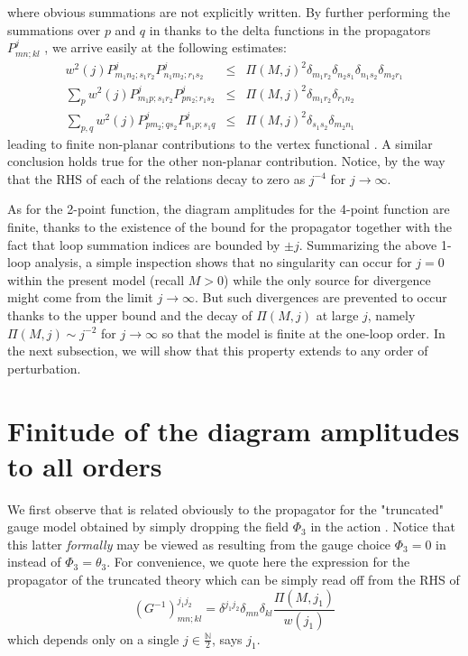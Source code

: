 \documentclass[10pt]{book}
\theoremstyle{break}
\begin{document}
where obvious summations are not explicitly written. By further performing the summations over $p$ and $q$ in %
thanks to the delta functions in the propagators $P^j_{mn;kl}$ %
, we arrive easily at the following estimates:
\begin{eqnarray}
w^2(j)P^j_{m_1n_2;s_1r_2}P^j_{n_1m_2;r_1s_2}&\le&\Pi(M,j)^2\delta_{m_1r_2}\delta_{n_2s_1}\delta_{n_1s_2}\delta_{m_2r_1}%
\\
\sum_pw^2(j)P^j_{m_1p;s_1r_2}P^j_{pn_2;r_1s_2}&\le&\Pi(M,j)^2\delta_{m_1r_2}\delta_{r_1n_2}%
\\
\sum_{p,q}w^2(j)P^j_{pm_2;qs_2}P^j_{n_1p;s_1q}&\le&\Pi(M,j)^2\delta_{s_1s_2}\delta_{m_2n_1}%
\end{eqnarray}
leading to finite non-planar contributions to the vertex functional %
. A similar conclusion holds true for the other non-planar contribution. Notice, by the way that the RHS of each of the relations %
decay to zero as $j^{-4}$ for $j\to\infty$.\par

As for the 2-point function, the diagram amplitudes for the 4-point function are finite, thanks to the existence of the bound for the propagator %
together with the fact that loop summation indices are bounded by $\pm j$. Summarizing the above 1-loop analysis, a simple inspection shows that no singularity can occur for $j=0$ within the present model (recall $M>0$) while the only source for divergence might come from the limit $j\to\infty$. But such divergences are prevented to occur thanks to the upper bound %
and the decay of $\Pi(M,j)$ %
at large $j$, namely $\Pi(M,j)\sim j^{-2}$ for $j\to\infty$ so that the model %
is finite at the one-loop order. In the next subsection, we will show that this property extends to any order of perturbation.


\section{Finitude of the diagram amplitudes to all orders}


We first observe that %
is related obviously to the propagator for the "truncated" gauge model obtained by simply dropping the field $\Phi_3$ in the action %
. Notice that this latter {\it{formally}} may be viewed as resulting from the gauge choice $\Phi_3=0$ in %
instead of $\Phi_3=\theta_3$. For convenience, we quote here the expression for the propagator of the truncated theory which can be simply read off from the RHS of %
\begin{equation}
(G^{-1})^{j_1j_2}_{mn;kl}=\delta^{j_1j_2}\delta_{mn}\delta_{kl}\frac{\Pi(M,j_1)}{w(j_1)}%
\end{equation}
which depends only on a single $j\in\frac{\mathbb{N}}{2}$, says $j_1$.
\end{document}
